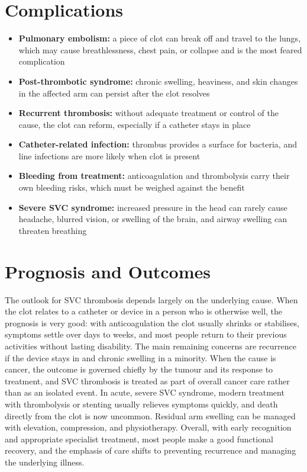 \section*{Complications}
\begin{itemize}
    \item \textbf{Pulmonary embolism:} a piece of clot can break off and travel to the lungs, which may cause breathlessness, chest pain, or collapse and is the most feared complication
    \item \textbf{Post-thrombotic syndrome:} chronic swelling, heaviness, and skin changes in the affected arm can persist after the clot resolves
    \item \textbf{Recurrent thrombosis:} without adequate treatment or control of the cause, the clot can reform, especially if a catheter stays in place
    \item \textbf{Catheter-related infection:} thrombus provides a surface for bacteria, and line infections are more likely when clot is present
    \item \textbf{Bleeding from treatment:} anticoagulation and thrombolysis carry their own bleeding risks, which must be weighed against the benefit
    \item \textbf{Severe SVC syndrome:} increased pressure in the head can rarely cause headache, blurred vision, or swelling of the brain, and airway swelling can threaten breathing
\end{itemize}

\section*{Prognosis and Outcomes}
The outlook for SVC thrombosis depends largely on the underlying cause. When the clot relates to a catheter or device in a person who is otherwise well, the prognosis is very good: with anticoagulation the clot usually shrinks or stabilises, symptoms settle over days to weeks, and most people return to their previous activities without lasting disability. The main remaining concerns are recurrence if the device stays in and chronic swelling in a minority. When the cause is cancer, the outcome is governed chiefly by the tumour and its response to treatment, and SVC thrombosis is treated as part of overall cancer care rather than as an isolated event. In acute, severe SVC syndrome, modern treatment with thrombolysis or stenting usually relieves symptoms quickly, and death directly from the clot is now uncommon. Residual arm swelling can be managed with elevation, compression, and physiotherapy. Overall, with early recognition and appropriate specialist treatment, most people make a good functional recovery, and the emphasis of care shifts to preventing recurrence and managing the underlying illness.

